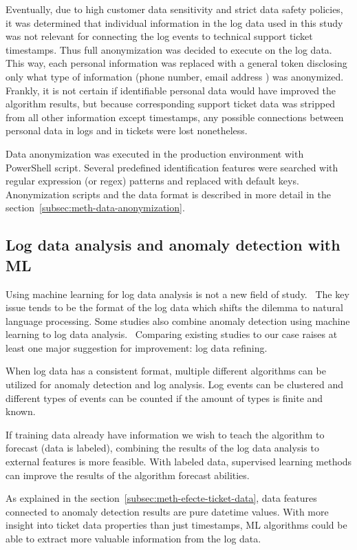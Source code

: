 Eventually,
due to high customer data sensitivity and strict data safety policies,
it was determined that individual information in the log data used in this study
was not relevant for connecting the log events to technical support ticket timestamps.
Thus full anonymization was decided to execute on the log data.
This way,
each personal information was replaced with a general token
disclosing only what type of information (phone number, email address \etc) was anonymized.
Frankly,
it is not certain if identifiable personal data would have improved the algorithm results,
but because corresponding support ticket data
was stripped from all other information except timestamps,
any possible connections between personal data in logs and in tickets
were lost nonetheless.

Data anonymization was executed in the production environment
with PowerShell script.
Several predefined identification features were searched with
regular expression (or regex) patterns and replaced with
default keys.
Anonymization scripts and the data format
is described in more detail in the section~\ref{subsec:meth-data-anonymization}.



\subsection{Log data analysis and anomaly detection with ML}\label{subsec:bg-log-data-analysis-and-anomaly-detection-with-ml}

Using machine learning for log data analysis
is not a new field of study.~\cite{rantala2019applying,allagi2019analysis,kondo2017early,cao2017machine}
The key issue tends to be the format of the log data
which shifts the dilemma to natural language processing.
Some studies also combine anomaly detection using machine learning
to log data analysis.~\cite{liu2019loganomaly, zhang2019robust}
Comparing existing studies to our case
raises at least one major suggestion for improvement:
log data refining.

When log data has a consistent format,
multiple different algorithms can be utilized
for anomaly detection and log analysis.
Log events can be clustered
and different types of events can be counted
if the amount of types is finite and known.~\cite{liu2019loganomaly}

If training data already have information
we wish to teach the algorithm to forecast (\ie data is labeled),
combining the results of the log data analysis to external features
is more feasible.
With labeled data,
supervised learning methods can improve the results of the algorithm forecast abilities.
~\cite{rantala2019applying}

As explained in the section~\ref{subsec:meth-efecte-ticket-data},
data features connected to anomaly detection results
are pure datetime values.
With more insight into ticket data properties than just timestamps,
ML algorithms could be able to extract more valuable information
from the log data.


\clearpage